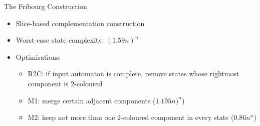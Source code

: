 \documentclass[12pt,handout]{beamer}
\begin{document}
\begin{frame}{The Fribourg Construction}
\begin{itemize}
\item Slice-based complementation construction
\item Worst-case state complexity: $(1.59n)^n$
\item Optimisations:
  \begin{itemize}
  \item R2C: if input automaton is complete, remove states whose rightmost component is 2-coloured
  \item M1: merge certain adjacent components ($1.195n)^n$)
  \item M2: keep not more than one 2-coloured component in every state ($0.86n^n$)
  \end{itemize}
\end{itemize}
\end{frame}
\end{document}
